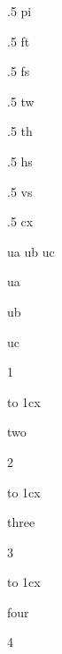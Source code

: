 \startTEXpage[offset=1ts]

    \the\dimexpr .5 pi \relax\par %
    \the\dimexpr .5 ft \relax\par %
    \the\dimexpr .5 fs \relax\par %
    \the\dimexpr .5 tw \relax\par %
    \the\dimexpr .5 th \relax\par %
    \the\dimexpr .5 hs \relax\par %
    \the\dimexpr .5 vs \relax\par %
    \the\dimexpr .5 cx \relax\par %

\newdimension \FooA   \FooA 1.23pt
\newdimen     \FooB   \FooB 12.3pt
\protected\def\FooC   {\the\dimexpr\FooA +\FooB\relax}

\pushoverloadmode
    \newuserunit\FooA ua
    \newuserunit\FooB ub
    \newuserunit\FooC uc
\popoverloadmode

\the{} ua \relax\par
\the{} ub \relax\par
\the{} uc \relax\par

\blank

   {1}
    { to 1cx{\strut two}}   {2}
    { to 1cx{\strut three}} {3}
    { to 1cx{\strut four}}  {4}
\stopcombination

\stopTEXpage
